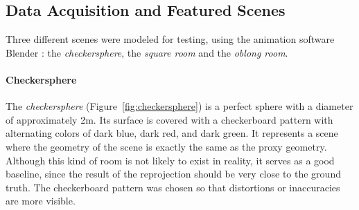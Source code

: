 
\subsection{Data Acquisition and Featured Scenes} \label{subsec:data_acquisition}


Three different scenes were modeled for testing, using the animation software Blender \cite{blender}: the \emph{checkersphere}, the \emph{square room} and the \emph{oblong room}.%

\paragraph{Checkersphere}
The \emph{checkersphere} (Figure~\ref{fig:checkersphere}) is a perfect sphere with a diameter of approximately 2m. Its surface is covered with a checkerboard pattern with alternating colors of dark blue, dark red, and dark green. It represents a scene where the geometry of the scene is exactly the same as the proxy geometry. Although this kind of room is not likely to exist in reality, it serves as a good baseline, since the result of the reprojection should be very close to the ground truth. The checkerboard pattern was chosen so that distortions or inaccuracies are more visible.


